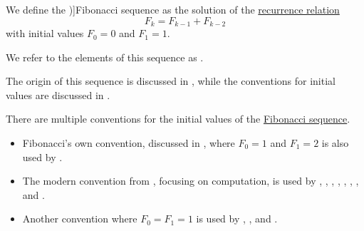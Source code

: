 \begin{definition}\label{def:fibonacci_number}
  We define the \term[ru=числа Фибоначчи (\cite[\S 5.7.3]{Новиков2013ДискретнаяМатематика})]{Fibonacci sequence} as the solution of the \hyperref[def:recurrence_relation]{recurrence relation}
  \begin{equation}\label{eq:def:fibonacci_number}
    F_k = F_{k-1} + F_{k-2}
  \end{equation}
  with initial values \( F_0 = 0 \) and \( F_1 = 1 \).

  We refer to the elements of this sequence as .
\end{definition}
\begin{comments}
  \item The origin of this sequence is discussed in , while the conventions for initial values are discussed in .
\end{comments}

\begin{remark}\label{rem:fibonacci_sequence_initial_value}
  There are multiple conventions for the initial values of the \hyperref[def:fibonacci_number]{Fibonacci sequence}.

  \begin{itemize}
    \item Fibonacci's own convention, discussed in , where \( F_0 = 1 \) and \( F_1 = 2 \) is also used by .

    \item The modern convention from , focusing on computation, is used by
    ,
    ,
    ,
    ,
    ,
    ,
    ,
     and
    .

    \item Another convention where \( F_0 = F_1 = 1 \) is used by
    ,
    ,
     and
    .
  \end{itemize}
\end{remark}

